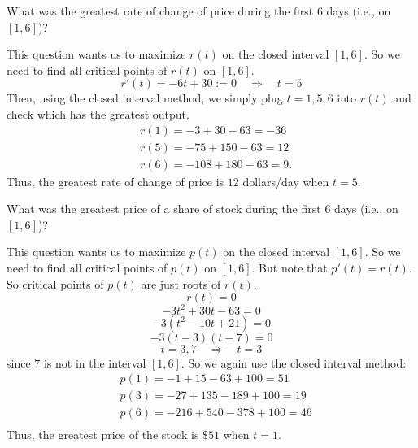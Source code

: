 \documentclass[nooutcomes]{ximera}
\renewenvironment{freeResponse}{
\ifhandout\setbox0\vbox\bgroup\else
\begin{trivlist}\item[\hskip \labelsep\bfseries Solution:\hspace{2ex}]
\fi}
{\ifhandout\egroup\else
\end{trivlist}
\fi}
\begin{document}
\begin{problem}
\begin{enumerate}
	\item  What was the greatest rate of change of price during the first $6$ days (i.e., on $[1,6]$)?
		\begin{freeResponse}
		This question wants us to maximize $r(t)$ on the closed interval $[1,6]$.
		So we need to find all critical points of $r(t)$ on $[1,6]$.
		$$ r'(t) = -6t+30:=0 \quad \Longrightarrow \quad t=5  $$
		Then, using the closed interval method, we simply plug $t=1,5,6$ into $r(t)$ and check which has the greatest output.
			\begin{align*}
			&r(1) = -3+30-63=-36  \\
			&r(5) = -75+150-63=12  \\
			&r(6) = -108+180-63=9.
			\end{align*}
		Thus, the greatest rate of change of price is $12$ dollars/day when $t=5$.
		\end{freeResponse}




	\item  What was the greatest price of a share of stock during the first $6$ days (i.e., on $[1,6]$)?
		\begin{freeResponse}
		This question wants us to maximize $p(t)$ on the closed interval $[1,6]$.
		So we need to find all critical points of $p(t)$ on $[1,6]$.
		But note that $p'(t) = r(t)$.  So critical points of $p(t)$ are just roots of $r(t)$.
		$$ r(t) = 0 $$
		$$ -3t^2+30t-63 = 0 $$
		$$ -3(t^2-10t+21)=0 $$
		$$ -3(t-3)(t-7) = 0 $$
		$$ t=3,7 \quad \Longrightarrow \quad t=3 $$
		since $7$ is not in the interval $[1,6]$.
		So we again use the closed interval method:
			\begin{align*}
			&p(1) = -1+15-63+100 = 51  \\
			&p(3) = -27 + 135 - 189 + 100 = 19  \\
			&p(6) = -216+540-378+100=46  \\
			\end{align*}
		Thus, the greatest price of the stock is $\$51$ when $t=1$.
		\end{freeResponse}
	\end{enumerate}
\end{problem}
\end{document}
